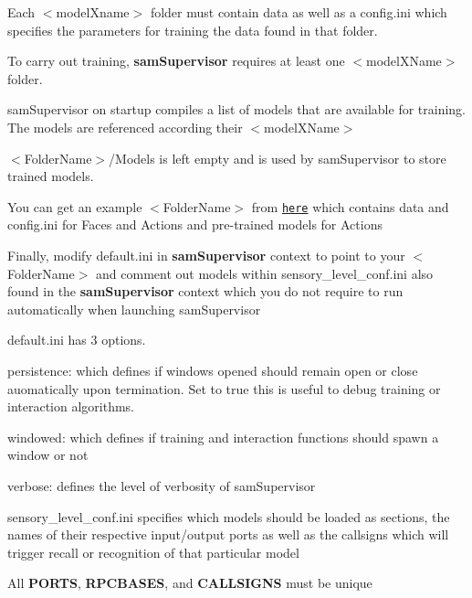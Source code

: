 \begin{DoxyEnumerate}
\item Each {\ttfamily $<$model\+Xname$>$} folder must contain data as well as a {\ttfamily config.\+ini} which specifies the parameters for training the data found in that folder.
\item To carry out training, {\bfseries sam\+Supervisor} requires at least one {\ttfamily $<$model\+X\+Name$>$} folder.
\item sam\+Supervisor on startup compiles a list of models that are available for training. The models are referenced according their {\ttfamily $<$model\+X\+Name$>$}
\item {\ttfamily $<$Folder\+Name$>$/\+Models} is left empty and is used by sam\+Supervisor to store trained models.
\item You can get an example {\ttfamily $<$Folder\+Name$>$} from \href{https://drive.google.com/open?id=0B6fkkRLTYjNLbjFFSEZtUmtHNk0}{\tt here} which contains data and config.\+ini for Faces and Actions and pre-\/trained models for Actions
\item Finally, modify {\ttfamily default.\+ini} in {\bfseries sam\+Supervisor} context to point to your {\ttfamily $<$Folder\+Name$>$} and comment out models within {\ttfamily sensory\+\_\+level\+\_\+conf.\+ini} also found in the {\bfseries sam\+Supervisor} context which you do not require to run automatically when launching sam\+Supervisor
\item {\ttfamily default.\+ini} has 3 options.
\begin{DoxyEnumerate}
\item persistence\+: which defines if windows opened should remain open or close auomatically upon termination. Set to true this is useful to debug training or interaction algorithms.
\item windowed\+: which defines if training and interaction functions should spawn a window or not
\item verbose\+: defines the level of verbosity of sam\+Supervisor
\end{DoxyEnumerate}
\item {\ttfamily sensory\+\_\+level\+\_\+conf.\+ini} specifies which models should be loaded as sections, the names of their respective input/output ports as well as the callsigns which will trigger recall or recognition of that particular model
\item All {\bfseries P\+O\+R\+TS}, {\bfseries R\+P\+C\+B\+A\+S\+ES}, and {\bfseries C\+A\+L\+L\+S\+I\+G\+NS} must be unique
\end{DoxyEnumerate}


